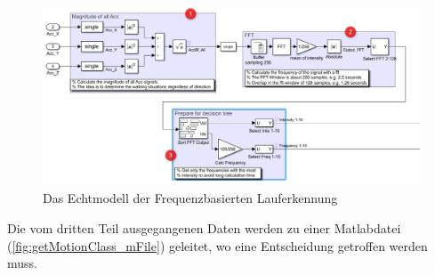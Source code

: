 \begin{figure}[H]
	\centering
	\includegraphics[width=\linewidth]{Bilder/Lauferkennung_Modell_1_1.png}
	\caption{Das Echtmodell der Frequenzbasierten Lauferkennung}
	\label{fig:Lauferkennung_Freqbasiert_FFT_Echtmodell}
\end{figure}

Die vom dritten Teil ausgegangenen Daten werden zu einer Matlabdatei (\autoref{fig:getMotionClass_mFile}) geleitet, wo eine Entscheidung getroffen werden muss.
%
%
%

